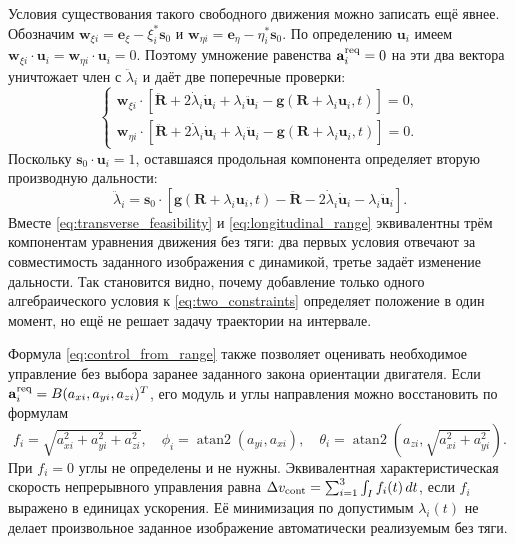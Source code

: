 \documentclass[a4paper,12pt]{article}
\begin{document}
Условия существования такого свободного движения можно записать
ещё явнее. Обозначим
$\mathbf w_{\xi i}=\mathbf e_\xi-\xi_i^*\mathbf s_0$ и
$\mathbf w_{\eta i}=\mathbf e_\eta-\eta_i^*\mathbf s_0$.
По определению $\mathbf u_i$ имеем
$\mathbf w_{\xi i}\cdot\mathbf u_i=
 \mathbf w_{\eta i}\cdot\mathbf u_i=0$.
Поэтому умножение равенства
$\mathbf a_i^{\rm req}=0$ на эти два вектора уничтожает
член с $\ddot\lambda_i$ и даёт две поперечные проверки:
\begin{equation}
\begin{cases}
 \mathbf w_{\xi i}\cdot
  [\ddot{\mathbf R}+2\dot\lambda_i\dot{\mathbf u}_i
      +\lambda_i\ddot{\mathbf u}_i
      -\mathbf g(\mathbf R+\lambda_i\mathbf u_i,t)]=0,\\
 \mathbf w_{\eta i}\cdot
  [\ddot{\mathbf R}+2\dot\lambda_i\dot{\mathbf u}_i
      +\lambda_i\ddot{\mathbf u}_i
      -\mathbf g(\mathbf R+\lambda_i\mathbf u_i,t)]=0.
\end{cases}
\label{eq:transverse_feasibility}
\end{equation}
Поскольку $\mathbf s_0\cdot\mathbf u_i=1$,
оставшаяся продольная компонента определяет вторую
производную дальности:
\begin{equation}
 \ddot\lambda_i=\mathbf s_0\cdot
  [\mathbf g(\mathbf R+\lambda_i\mathbf u_i,t)
       -\ddot{\mathbf R}
       -2\dot\lambda_i\dot{\mathbf u}_i
       -\lambda_i\ddot{\mathbf u}_i].
 \label{eq:longitudinal_range}
\end{equation}
Вместе \eqref{eq:transverse_feasibility} и
\eqref{eq:longitudinal_range} эквивалентны трём компонентам
уравнения движения без тяги: два первых условия отвечают
за совместимость заданного изображения с динамикой, третье
задаёт изменение дальности. Так становится видно, почему
добавление только одного алгебраического условия к
\eqref{eq:two_constraints} определяет положение в один момент,
но ещё не решает задачу траектории на интервале.

Формула \eqref{eq:control_from_range} также позволяет оценивать
необходимое управление без выбора заранее заданного закона
ориентации двигателя. Если
$\mathbf a_i^{\rm req}=B(a_{xi},a_{yi},a_{zi})^T$, его модуль
и углы направления можно восстановить по формулам
\begin{equation}
 f_i=\sqrt{a_{xi}^2+a_{yi}^2+a_{zi}^2},\quad
 \phi_i=\operatorname{atan2}(a_{yi},a_{xi}),\quad
 \theta_i=\operatorname{atan2}
        (a_{zi},\sqrt{a_{xi}^2+a_{yi}^2}).
 \label{eq:control_angles}
\end{equation}
При $f_i=0$ углы не определены и не нужны.
Эквивалентная характеристическая скорость непрерывного
управления равна
$\Delta v_{\rm cont}=\sum_{i=1}^{3}\int_I f_i(t)\,dt$,
если $f_i$ выражено в единицах ускорения. Её минимизация
по допустимым $\lambda_i(t)$ не делает произвольное
заданное изображение автоматически реализуемым без тяги.
\end{document}

